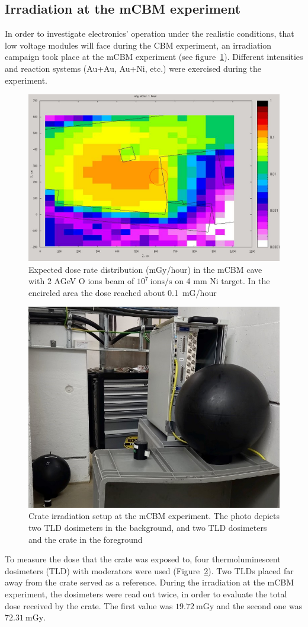 \subsection{Irradiation at the mCBM experiment}
In order to investigate electronics' operation under the realistic conditions, that low voltage modules will face during the CBM experiment, an irradiation campaign took place at the mCBM experiment (see figure~\ref{fig:CBM1}). Different intensities and reaction systems (Au+Au, Au+Ni, etc.) were exercised during the experiment.
\begin{figure}[!h]
    \centering
    \includegraphics[width=0.65\columnwidth]{Chapter4/images/dose1.jpg}
    \caption{Expected dose rate distribution (mGy/hour) in the mCBM cave with 2 AGeV O ions beam of $10^{7}\mathrm{\ ions/s}$ on 4 mm Ni target. In the encircled area the dose reached about 0.1~mG/hour}
     \label{fig:CBM1}
\end{figure}
\begin{figure}[!h]
    \centering
    \includegraphics[width=0.5\columnwidth]{Chapter4/images/crate.jpg}
    \caption{Crate irradiation setup at the mCBM experiment. The photo depicts two TLD dosimeters in the background, and two TLD dosimeters and the crate in the foreground}
    \label{fig:crate}
\end{figure}
\newpage
To measure the dose that the crate was exposed to, four thermoluminescent dosimeters (\gls{TLD}) with moderators were used (Figure~\ref{fig:crate}). Two TLDs placed far away from the crate served as a reference. During the irradiation at the mCBM experiment, the dosimeters were read out twice, in order to evaluate the total dose received by the crate. The first value was $19.72\mathrm{\ mGy}$ and  the second one was $72.31\mathrm{\ mGy}$. 

